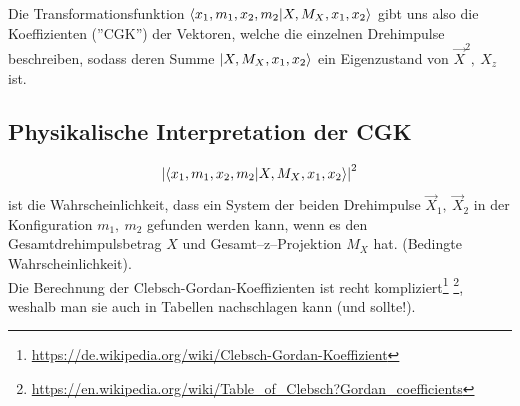 \documentclass[Ex4_Zusammenfassung.tex]{subfiles}
\begin{document}
Die Transformationsfunktion $\braket{x_1, m_1, x_2,m_2|X, M_X, x_1, x_2}$ gibt uns also die Koeffizienten (''CGK'') der Vektoren, welche die einzelnen Drehimpulse beschreiben, sodass deren Summe $\ket{X, M_X, x_1, x_2}$ ein Eigenzustand von $\vec{X}^2,\ X_z$ ist. 

\subsection{Physikalische Interpretation der CGK}
\begin{equation}
	\left\vert \braket{x_1, m_1, x_2,m_2|X, M_X, x_1, x_2} \right\vert^2
\end{equation}
ist die Wahrscheinlichkeit, dass ein System der beiden Drehimpulse $\vec{X}_1,\ \vec{X}_2$ in der Konfiguration $m_1,\ m_2$ gefunden werden kann, wenn es den Gesamtdrehimpulsbetrag $X$ und Gesamt--z--Projektion $M_X$ hat. (Bedingte Wahrscheinlichkeit).\\

Die Berechnung der Clebsch-Gordan-Koeffizienten ist recht kompliziert\footnote{\href{https://de.wikipedia.org/wiki/Clebsch-Gordan-Koeffizient}{https://de.wikipedia.org/wiki/Clebsch-Gordan-Koeffizient}} \footnote{\href{https://en.wikipedia.org/wiki/Table_of_Clebsch?Gordan_coefficients}{https://en.wikipedia.org/wiki/Table\_of\_Clebsch?Gordan\_coefficients}}, weshalb man sie auch in Tabellen nachschlagen kann (und sollte!).
\end{document}
